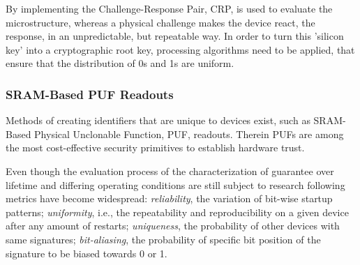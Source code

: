 By implementing the Challenge-Response Pair, CRP, is used to evaluate the microstructure, whereas a physical challenge
makes the device react, the response, in an unpredictable, but repeatable way.
In order to turn this 'silicon key' into a cryptographic root key, processing algorithms need to be applied, that ensure
that the distribution of 0s and 1s are uniform. \cite{herder2014physical}

\subsubsection{SRAM-Based PUF Readouts} %
\label{sec:SRAM-Based PUF Readouts}

Methods of creating identifiers that are unique to devices exist, such as SRAM-Based Physical Unclonable Function, PUF,
readouts. Therein PUFs are among the most cost-effective security primitives to establish hardware trust.
\cite{holcomb2007initial}

Even though the evaluation process of the characterization of guarantee over lifetime and differing operating conditions
are still subject to research following metrics have become widespread: \textit{reliability}, the variation of bit-wise
startup patterns; \textit{uniformity}, i.e., the repeatability and reproducibility on a given device after any amount of
restarts; \textit{uniqueness}, the probability of other devices with same signatures; \textit{bit-aliasing}, the
probability of specific bit position of the signature to be biased towards 0 or 1. \cite{vinagrero2023sram}



